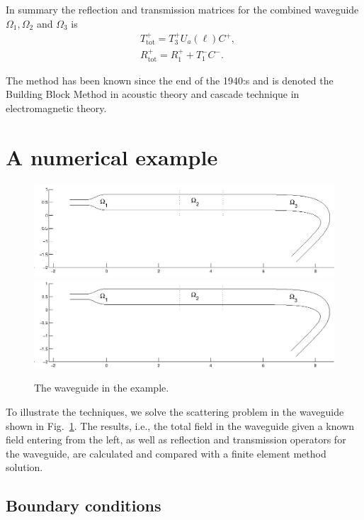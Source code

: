 \documentclass[numreferences]{kluwer}
\newcommand{\Ttot}{T^+_{\text{tot}}}
\newcommand{\Rtot}{R^+_{\text{tot}}}
\begin{document}
In summary the reflection and transmission matrices for the combined
waveguide $\Omega_1, \Omega_2$ and $\Omega_3$ is
\begin{equation}
  \label{eq:ABRtotTtot2}
  \begin{split}
    &\Ttot=T_3^{+}U_a(\ell)C^+,\\
    &\Rtot=R_1^{+}+T_1^{-}C^-.
  \end{split}
\end{equation}

The method has been known since the end of the 1940:s \cite{kerns1949}
and is denoted the Building Block Method \cite{nilssonbrander1981b} in
acoustic theory and cascade technique \cite{jones1986} in
electromagnetic theory.



\section{A numerical example}
\label{sec:numerical-example}
\begin{figure}[htb]
  \centering \ifpdf
  \includegraphics[width=\textwidth]{waveguide.jpg}
  \else
  \includegraphics[width=\textwidth]{waveguide.eps}
  \fi
  \caption{The waveguide in the example.}
  \label{fig:exwg}
\end{figure}
To illustrate the techniques, we solve the scattering problem
in the waveguide shown in Fig.~\ref{fig:exwg}.
The results, i.e., the total field in the waveguide given a known
field entering from the left, as well as reflection and transmission
operators for the waveguide, are calculated and compared with a finite
element method solution.

\subsection{Boundary conditions}
\label{sec:boundary-conditions}
\end{document}

